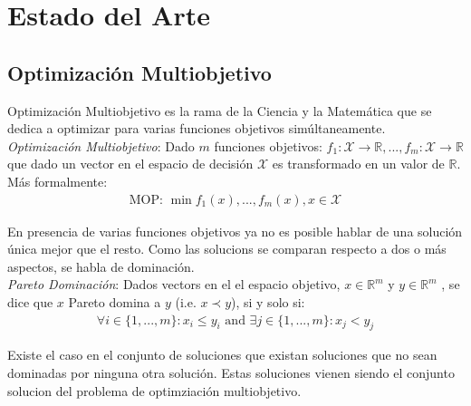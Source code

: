 \chapter{Estado del Arte}\label{chapter:state-of-the-art}

\section{Optimizaci\'on Multiobjetivo}

Optimizaci\'on Multiobjetivo es la rama de la Ciencia y la Matem\'atica que se dedica a optimizar para varias funciones objetivos sim\'ultaneamente.\\

\textit{Optimizaci\'on Multiobjetivo}: Dado $m$ funciones objetivos: $f_1: \mathcal{X} \rightarrow \mathbb{R}, ..., f_m: \mathcal{X} \rightarrow \mathbb{R}$ que dado un vector en el espacio de decisi\'on $\mathcal{X}$ es transformado en un valor de $\mathbb{R}$. M\'as formalmente:
\begin{align*}
    \text{MOP: }\min f_1(x), ..., f_m(x), x \in \mathcal{X}
\end{align*}

En presencia de varias funciones objetivos ya no es posible hablar de una soluci\'on \'unica mejor que el resto.  
Como las solucions se comparan respecto a dos o m\'as aspectos, se habla de dominaci\'on.\\

\textit{Pareto Dominaci\'on}: Dados vectors en el el espacio objetivo, $x \in \mathbb{R}^m$ y $y \in \mathbb{R}^m$ , se dice que $x$ Pareto domina a $y$ (i.e. $x \prec y$), si y solo si:
\begin{align*}
    \forall i \in \{1, ..., m\}: x_i \leq y_i \text{ and } \exists j \in \{1, ..., m\}: x_j < y_j 
\end{align*}


Existe el caso en el conjunto de soluciones que existan soluciones que no sean dominadas por ninguna otra soluci\'on. Estas soluciones vienen siendo el conjunto solucion del problema de optimziaci\'on multiobjetivo.\\


